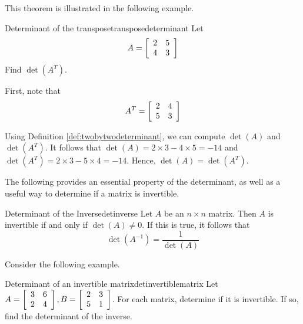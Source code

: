 This theorem is illustrated in the following example. 

\begin{example}{Determinant of the transpose}{transposedeterminant}
Let
\begin{equation*}
A
=
\left[
\begin{array}{rr}
2 & 5 \\
4 & 3
\end{array}
\right]
\end{equation*}
Find $\det \left(A^T\right)$.
\end{example}

\begin{solution}
First, note that 
\begin{equation*}
A^{T}
=
\left[
\begin{array}{rr}
2 & 4 \\
5 & 3
\end{array}
\right]
\end{equation*}

Using Definition \ref{def:twobytwodeterminant}, we can compute $\det \left(A\right)$ and $\det \left(A^T\right)$. It follows that
$\det \left(A\right) = 2 \times 3 - 4 \times 5 = -14$ and $\det \left(A^T\right) = 2 \times 3 - 5 \times 4 = -14$. 
Hence, $\det \left(A\right) = \det \left(A^T\right)$.
\end{solution}

The following provides an essential property of the determinant, as well as a useful way to determine if a matrix is invertible.

\begin{theorem}{Determinant of the Inverse}{detinverse}
Let $A$ be an $n \times n$ matrix. Then $A$ is invertible if and only if $\det(A) \neq 0$. If this is true, it follows that 
\[
\det(A^{-1}) = \frac{1}{\det(A)}
\]
\end{theorem}

Consider the following example.

\begin{example}{Determinant of an invertible matrix}{detinvertiblematrix}
Let $A = \left[ \begin{array}{rr}
3 & 6 \\
2 & 4 
\end{array} \right], B = \left[ \begin{array}{rr}
2 & 3 \\
5 & 1
\end{array} \right]$. For each matrix, determine if it is invertible. If so, find the determinant of the inverse. 
\end{example}

